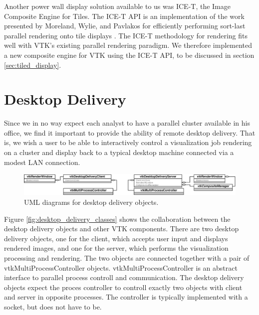 \documentclass[twocolumn]{article}
\begin{document}
Another power wall display solution available to us was ICE-T, the Image
Composite Engine for Tiles.  The ICE-T API is an implementation of the work
presented by Moreland, Wylie, and Pavlakos for efficiently performing
sort-last parallel rendering onto tile displays \cite{Moreland01}.  The
ICE-T methodology for rendering fits well with VTK's existing parallel
rendering paradigm.  We therefore implemented a new composite engine for
VTK using the ICE-T API, to be discussed in section
\ref{sec:tiled_display}.


\section{Desktop Delivery}
\label{sec:desktop_delivery}

Since we in no way expect each analyst to have a parallel cluster available
in his office, we find it important to provide the ability of remote
desktop delivery.  That is, we wish a user to be able to interactively
control a visualization job rendering on a cluster and display back to a
typical desktop machine connected via a modest LAN connection.

\begin{figure}
  \begin{center}
    \includegraphics[scale=0.23]{images/DesktopDeliveryClasses}
  \end{center}
  \caption{UML diagrams for desktop delivery objects.}
  \label{fig:desktop_delivery_classes}
\end{figure}

Figure \vref{fig:desktop_delivery_classes} shows the collaboration between
the desktop delivery objects and other VTK components.  There are two
desktop delivery objects, one for the client, which accepts user input and
displays rendered images, and one for the server, which performs the
visualization processing and rendering.  The two objects are connected
together with a pair of vtkMultiProcessController objects.
vtkMultiProcessController is an abstract interface to parallel process
controll and communication.  The desktop delivery objects expect the proces
controller to controll exactly two objects with client and server in
opposite processes.  The controller is typically implemented with a socket,
but does not have to be.
\end{document}
